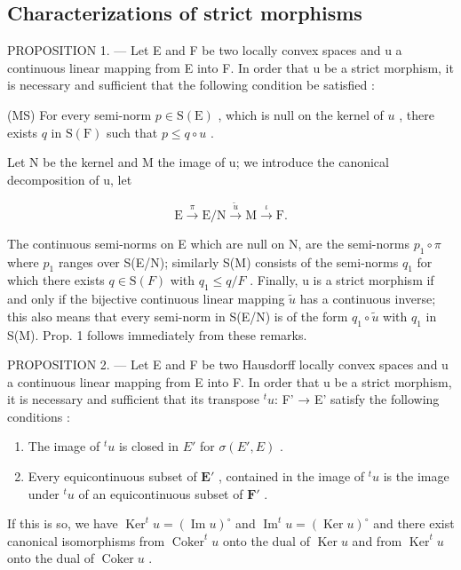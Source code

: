 \subsection{Characterizations of strict morphisms}

PROPOSITION 1. --- Let E and F be two locally convex spaces and u a continuous linear mapping from E into F. In order that u be a strict morphism, it is necessary and sufficient that the following condition be satisfied :

(MS) For every semi-norm \(p \in \mathrm{S}(\mathrm{E})\) , which is null on the kernel of \(u\) , there exists \(q\) in \(\mathrm{S}(\mathrm{F})\) such that \(p \leqslant q \circ u\) .

Let N be the kernel and M the image of u; we introduce the canonical decomposition of u, let

\[
\mathrm{E} \xrightarrow {\pi} \mathrm{E} / \mathrm{N} \xrightarrow {\tilde {u}} \mathrm{M} \xrightarrow {\iota} \mathrm{F}.
\]

The continuous semi-norms on E which are null on N, are the semi-norms \(p_{1} \circ \pi\) where \(p_{1}\) ranges over S(E/N); similarly S(M) consists of the semi-norms \(q_{1}\) for which there exists \(q \in \mathrm{S}(F)\) with \(q_{1} \leqslant q/F\) . Finally, u is a strict morphism if and only if the bijective continuous linear mapping \(\tilde{u}\) has a continuous inverse; this also means that every semi-norm in S(E/N) is of the form \(q_{1} \circ \tilde{u}\) with \(q_{1}\) in S(M). Prop. 1 follows immediately from these remarks.

PROPOSITION 2. --- Let E and F be two Hausdorff locally convex spaces and u a continuous linear mapping from E into F. In order that u be a strict morphism, it is necessary and sufficient that its transpose \({}^t u\): F' → E' satisfy the following conditions :

\begin{enumerate}
\def\labelenumi{\alph{enumi})}
\item
  The image of \(^{t}u\) is closed in \(E'\) for \(\sigma(E', E)\) .
\item
  Every equicontinuous subset of \(\mathbf{E}'\) , contained in the image of \({}^t u\) is the image under \({}^t u\) of an equicontinuous subset of \(\mathbf{F}'\) .
\end{enumerate}

If this is so, we have \(\operatorname{Ker}^t u = (\operatorname{Im} u)^\circ\) and \(\operatorname{Im}^t u = (\operatorname{Ker} u)^\circ\) and there exist canonical isomorphisms from \(\operatorname{Coker}^t u\) onto the dual of \(\operatorname{Ker} u\) and from \(\operatorname{Ker}^t u\) onto the dual of \(\operatorname{Coker} u\) .

